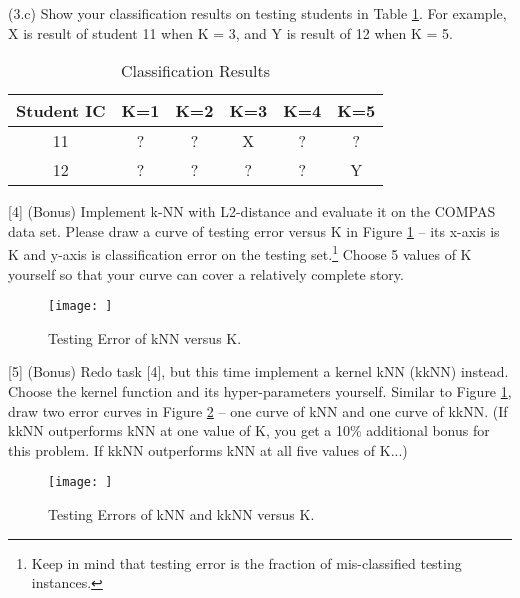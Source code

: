 \documentclass{llncs}
\begin{document}
(3.c) Show your classification results on testing 
students in Table \ref{tab:hw11_tab5}. For example, 
X is result of student 11 when K = 3, and Y is 
result of 12 when K = 5. 

\begin{table}
\caption{Classification Results}
\centering
\setlength{\tabcolsep}{10pt} %
\def\arraystretch{2} %
\begin{tabular}{c|c|c|c|c|c} \hline 
Student IC & K=1 & K=2 & K=3 & K=4 & K=5 \\ \hline
11  & ? & ? & X & ? & ? \\ \hline
12  & ? & ? & ? & ? & Y \\ \hline
\end{tabular}
\label{tab:hw11_tab5}
\end{table}

\newpage 

[4] (Bonus) Implement k-NN with L2-distance 
and evaluate it on the COMPAS data set. 
Please draw a curve of testing error versus 
K in Figure \ref{hw11_fig1} -- its x-axis is K 
and y-axis is classification error on the 
testing set.\footnote{Keep in mind that testing 
error is the fraction of mis-classified testing
instances.} Choose 5 values of K yourself so 
that your curve can cover a relatively complete 
story. 

\begin{figure}[h!] 
\centering 
\texttt{[image: ]} 
\caption{Testing Error of kNN versus K.} 
\label{hw11_fig1}
\end{figure}

\newpage 

[5] (Bonus) Redo task [4], but this time 
implement a kernel kNN (kkNN) instead. 
Choose the kernel function and its hyper-parameters  
yourself. Similar to Figure \ref{hw11_fig1}, 
draw two error curves in Figure \ref{hw11_fig2} 
-- one curve of kNN and one curve of kkNN. 
(If kkNN outperforms kNN at one value of K, 
you get a 10\% additional bonus for this problem. 
If kkNN outperforms kNN at all five values of K...) 

\begin{figure}[h!] 
\centering 
\texttt{[image: ]} 
\caption{Testing Errors of kNN and kkNN versus K.} 
\label{hw11_fig2}
\end{figure}
\end{document}
